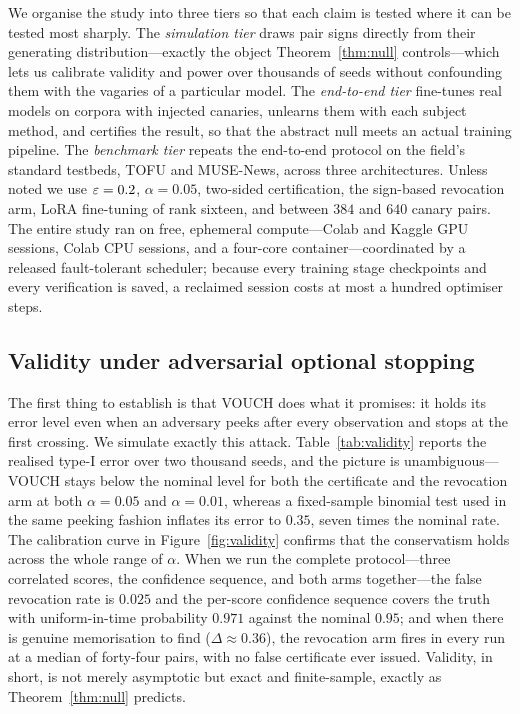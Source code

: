 We organise the study into three tiers so that each claim is tested where it can be
tested most sharply. The \emph{simulation tier} draws pair signs directly from their
generating distribution---exactly the object Theorem~\ref{thm:null} controls---which
lets us calibrate validity and power over thousands of seeds without confounding them
with the vagaries of a particular model. The \emph{end-to-end tier} fine-tunes real
models on corpora with injected canaries, unlearns them with each subject method, and
certifies the result, so that the abstract null meets an actual training pipeline.
The \emph{benchmark tier} repeats the end-to-end protocol on the field's standard
testbeds, TOFU and MUSE-News, across three architectures. Unless noted we use
$\varepsilon = 0.2$, $\alpha = 0.05$, two-sided certification, the sign-based revocation arm,
LoRA fine-tuning of rank sixteen, and between $384$ and $640$ canary pairs. The entire
study ran on free, ephemeral compute---Colab and Kaggle GPU sessions, Colab CPU
sessions, and a four-core container---coordinated by a released fault-tolerant
scheduler; because every training stage checkpoints and every verification is saved,
a reclaimed session costs at most a hundred optimiser steps.

\subsection{Validity under adversarial optional stopping}\label{sec:exp-validity}

The first thing to establish is that VOUCH does what it promises: it holds its error
level even when an adversary peeks after every observation and stops at the first
crossing. We simulate exactly this attack. Table~\ref{tab:validity} reports the
realised type-I error over two thousand seeds, and the picture is unambiguous---VOUCH
stays below the nominal level for both the certificate and the revocation arm at both
$\alpha=0.05$ and $\alpha=0.01$, whereas a fixed-sample binomial test used in the same
peeking fashion inflates its error to $0.35$, seven times the nominal rate. The
calibration curve in Figure~\ref{fig:validity} confirms that the conservatism holds
across the whole range of $\alpha$. When we run the complete protocol---three
correlated scores, the confidence sequence, and both arms together---the false
revocation rate is $0.025$ and the per-score confidence sequence covers the truth with
uniform-in-time probability $0.971$ against the nominal $0.95$; and when there is
genuine memorisation to find ($\Delta \approx 0.36$), the revocation arm fires in every
run at a median of forty-four pairs, with no false certificate ever issued. Validity,
in short, is not merely asymptotic but exact and finite-sample, exactly as
Theorem~\ref{thm:null} predicts.

